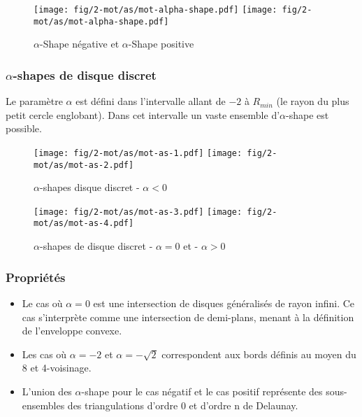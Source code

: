 \begin{figure}[H]
  \centering
  \texttt{[image: fig/2-mot/as/mot-alpha-shape.pdf]}
  \texttt{[image: fig/2-mot/as/mot-alpha-shape.pdf]}
  \caption{$\alpha$-Shape négative et $\alpha$-Shape positive }
\end{figure}


\subsubsection{$\alpha$-shapes de disque discret}

Le paramètre $\alpha$ est défini dans l'intervalle allant de $-2$ à $R_{min}$ (le rayon du plus petit cercle englobant). 
Dans cet intervalle un vaste ensemble d'$\alpha$-shape est possible.  

\begin{figure}[H]
  \centering
  \texttt{[image: fig/2-mot/as/mot-as-1.pdf]}
  \texttt{[image: fig/2-mot/as/mot-as-2.pdf]}
  \caption{$\alpha$-shapes disque discret - $\alpha < 0$}
\end{figure}

\begin{figure}[H]
  \centering
  \texttt{[image: fig/2-mot/as/mot-as-3.pdf]}
  \texttt{[image: fig/2-mot/as/mot-as-4.pdf]}
  \caption{$\alpha$-shapes de disque discret - $\alpha = 0$ et - $\alpha > 0$}
\end{figure}



\subsubsection{Propriétés}


\begin{itemize}
  \item Le cas où $\alpha = 0$ est une intersection de disques généralisés de rayon infini. Ce cas s'interprète comme une intersection de demi-plans, menant à la définition de l'enveloppe convexe.
  \item Les cas où $\alpha = -2$ et $\alpha = -\sqrt{2}$ correspondent aux bords définis au moyen du 8 et 4-voisinage. 
  \item L'union des $\alpha$-shape \cite{EdeKirSei83} pour le cas négatif et le cas positif représente des sous-ensembles des triangulations d'ordre 0 et d'ordre n de Delaunay.   
\end{itemize}
 
